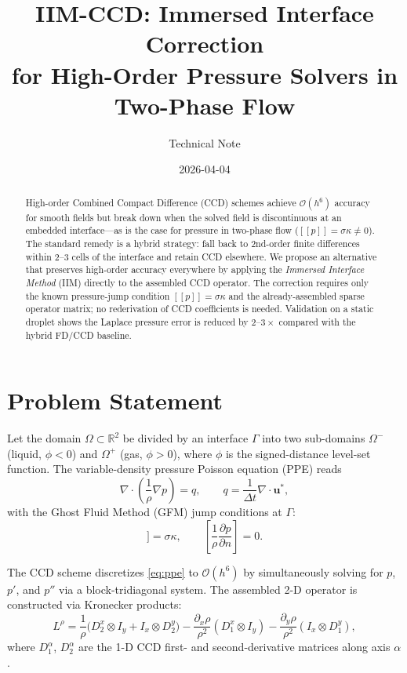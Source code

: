 \documentclass[11pt, a4paper]{article}
\title{\textbf{IIM-CCD: Immersed Interface Correction\\
for High-Order Pressure Solvers in Two-Phase Flow}}
\author{Technical Note}
\date{2026-04-04}
\newcommand{\jump}[1]{[\![#1]\!]}
\newcommand{\Ord}[1]{\mathcal{O}(#1)}
\begin{document}
\maketitle

\begin{abstract}
High-order Combined Compact Difference (CCD) schemes achieve $\Ord{h^6}$ accuracy
for smooth fields but break down when the solved field is discontinuous at an
embedded interface---as is the case for pressure in two-phase flow
($\jump{p} = \sigma\kappa \neq 0$).
The standard remedy is a hybrid strategy: fall back to 2nd-order finite
differences within 2--3 cells of the interface and retain CCD elsewhere.
We propose an alternative that preserves high-order accuracy everywhere by
applying the \emph{Immersed Interface Method} (IIM) directly to the assembled
CCD operator.
The correction requires only the known pressure-jump condition
$\jump{p} = \sigma\kappa$ and the already-assembled sparse operator matrix;
no rederivation of CCD coefficients is needed.
Validation on a static droplet shows the Laplace pressure error is reduced
by $2$--$3\times$ compared with the hybrid FD/CCD baseline.
\end{abstract}

\section{Problem Statement}
\label{sec:problem}

Let the domain $\Omega \subset \mathbb{R}^2$ be divided by an interface
$\Gamma$ into two sub-domains $\Omega^-$ (liquid, $\phi < 0$) and
$\Omega^+$ (gas, $\phi > 0$), where $\phi$ is the signed-distance level-set
function.
The variable-density pressure Poisson equation (PPE) reads
\begin{equation}
  \nabla \cdot \!\left(\frac{1}{\rho}\nabla p\right) = q, \qquad
  q = \frac{1}{\Delta t}\nabla \cdot \mathbf{u}^*, \label{eq:ppe}
\end{equation}
with the Ghost Fluid Method (GFM) jump conditions at $\Gamma$:
\begin{equation}
  \jump{p} = \sigma\kappa, \qquad
  \left[\frac{1}{\rho}\frac{\partial p}{\partial n}\right] = 0. \label{eq:jump}
\end{equation}

The CCD scheme \cite{chu1998} discretizes \eqref{eq:ppe} to $\Ord{h^6}$ by
simultaneously solving for $p$, $p'$, and $p''$ via a block-tridiagonal system.
The assembled 2-D operator is constructed via Kronecker products:
\begin{equation}
  L^{\rho} = \frac{1}{\rho}\bigl(D_2^x \otimes I_y + I_x \otimes D_2^y\bigr)
             - \frac{\partial_x\rho}{\rho^2}(D_1^x \otimes I_y)
             - \frac{\partial_y\rho}{\rho^2}(I_x \otimes D_1^y), \label{eq:Lrho}
\end{equation}
where $D_1^\alpha$, $D_2^\alpha$ are the 1-D CCD first- and second-derivative
matrices along axis $\alpha$.
\end{document}

